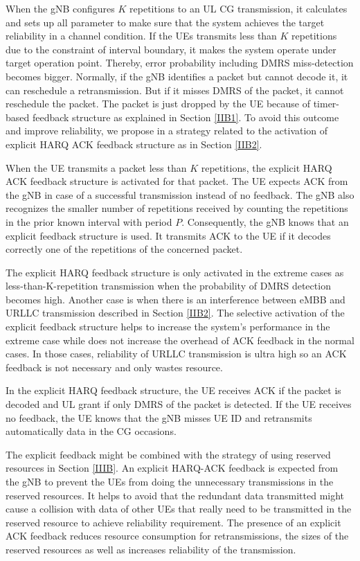 \documentclass{ieeeaccess}
\begin{document}
When the gNB configures $K$ repetitions to an UL CG transmission, it calculates and sets up all parameter to make sure that the system achieves the target reliability in a channel condition. If the UEs transmits less than $K$ repetitions due to the constraint of interval boundary, it makes the system operate under target operation point. Thereby, error probability including DMRS miss-detection becomes bigger. Normally, if the gNB identifies a packet but cannot decode it, it can reschedule a retransmission. But if it misses DMRS of the packet, it cannot reschedule the packet. The packet is just dropped by the UE because of timer-based feedback structure as explained in Section \ref{IIB1}. To avoid this outcome and improve reliability, we propose in \cite{ad100} a strategy related to the activation of explicit HARQ ACK feedback structure as in Section \ref{IIB2}.

When the UE transmits a packet less than $K$ repetitions, the explicit HARQ ACK feedback structure is activated for that packet. The UE expects ACK from the gNB in case of a successful transmission instead of no feedback. The gNB also recognizes the smaller number of repetitions received by counting the repetitions in the prior known interval with period $P$. Consequently, the gNB knows that an explicit feedback structure is used. It transmits ACK to the UE if it decodes correctly one of the repetitions of the concerned packet.

The explicit HARQ feedback structure is only activated in the extreme cases as less-than-K-repetition transmission when the probability of DMRS detection becomes high. Another case is when there is an interference between eMBB and URLLC transmission described in Section \ref{IIB2}. The selective activation of the explicit feedback structure helps to increase the system's performance in the extreme case while does not increase the overhead of ACK feedback in the normal cases. In those cases, reliability of URLLC transmission is ultra high so an ACK feedback is not necessary and only wastes resource.

In the explicit HARQ feedback structure, the UE receives ACK if the packet is decoded and UL grant if only DMRS of the packet is detected. If the UE receives no feedback, the UE knows that the gNB misses UE ID and retransmits automatically data in the CG occasions.

The explicit feedback might be combined with the strategy of using reserved resources in Section \ref{IIIB}. An explicit HARQ-ACK feedback is expected from the gNB to prevent the UEs from doing the unnecessary transmissions in the reserved resources. It helps to avoid that the redundant data transmitted might cause a collision with data of other UEs that really need to be transmitted in the reserved resource to achieve reliability requirement. The presence of an explicit ACK feedback reduces resource consumption for retransmissions, the sizes of the reserved resources as well as increases reliability of the transmission. 
\end{document}

